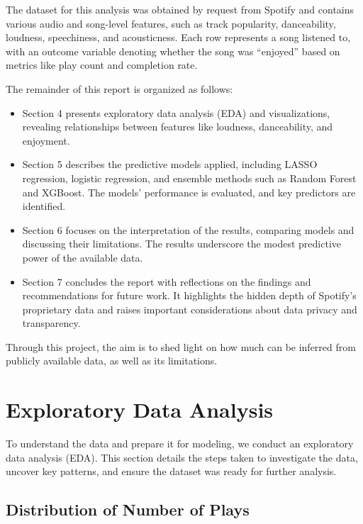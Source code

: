 \documentclass[11pt]{article}
\begin{document}
The dataset for this analysis was obtained by request from Spotify and
contains various audio and song-level features, such as track
popularity, danceability, loudness, speechiness, and acousticness. Each
row represents a song listened to, with an outcome variable denoting
whether the song was ``enjoyed'' based on metrics like play count and
completion rate.

The remainder of this report is organized as follows:

\begin{itemize}
\item
  Section 4 presents exploratory data analysis (EDA) and visualizations,
  revealing relationships between features like loudness, danceability,
  and enjoyment.
\item
  Section 5 describes the predictive models applied, including LASSO
  regression, logistic regression, and ensemble methods such as Random
  Forest and XGBoost. The models' performance is evaluated, and key
  predictors are identified.
\item
  Section 6 focuses on the interpretation of the results, comparing
  models and discussing their limitations. The results underscore the
  modest predictive power of the available data.
\item
  Section 7 concludes the report with reflections on the findings and
  recommendations for future work. It highlights the hidden depth of
  Spotify's proprietary data and raises important considerations about
  data privacy and transparency.
\end{itemize}

Through this project, the aim is to shed light on how much can be
inferred from publicly available data, as well as its limitations.

    \section{Exploratory Data Analysis}\label{exploratory-data-analysis}

    To understand the data and prepare it for modeling, we conduct an
exploratory data analysis (EDA). This section details the steps taken to
investigate the data, uncover key patterns, and ensure the dataset was
ready for further analysis.

\subsection{Distribution of Number of
Plays}\label{distribution-of-number-of-plays}
\end{document}
